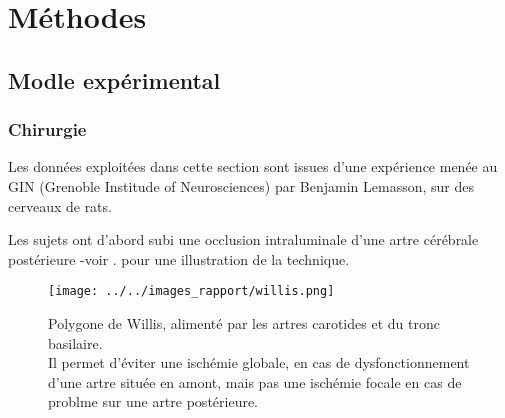 \section{M\'ethodes}

\makeatletter
\renewcommand{\thefigure}{\ifnum \c@section>\z@ \thesection.\fi
 \@arabic\c@figure}
\makeatother
\begin{comment}
Remarque : pour renuméroter les sous-figures de la même manière
           (avec le package 'subfigure'), il suffit de rajouter
	   la ligne \let\p@subfigure\thefigure dans le préambule.
\end{comment}

\subsection{Modle exp\'erimental}

\subsubsection{Chirurgie}

Les donn\'ees exploit\'ees dans cette section sont issues d'une exp\'erience men\'ee au GIN (Grenoble Institude of Neurosciences) par Benjamin Lemasson, %
sur des cerveaux de rats.

\par
Les sujets ont d'abord subi une occlusion intraluminale d'une artre c\'er\'ebrale post\'erieure -voir \cite{Durukan_PBB_07}. pour une illustration de la technique.


\begin{figure}[H]
\texttt{[image: ../../images\_rapport/willis.png]}
\caption{Polygone de Willis, aliment\'e par les artres carotides et du tronc basilaire.
\\
Il permet d'\'eviter une isch\'emie globale, en cas de dysfonctionnement d'une artre situ\'ee en amont, %
mais pas une isch\'emie focale en cas de problme sur une artre post\'erieure.
}
\label{willis}
\end{figure}

